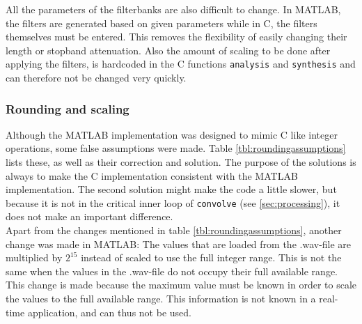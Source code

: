 \documentclass[a4paper]{article}
\begin{document}
All the parameters of the filterbanks are also difficult to change. In MATLAB, the filters are generated based on given parameters while in C, the filters themselves must be entered. This removes the flexibility of easily changing their length or stopband attenuation. Also the amount of scaling to be done after applying the filters, is hardcoded in the C functions \texttt{analysis} and \texttt{synthesis} and can therefore not be changed very quickly.

\subsubsection{Rounding and scaling}\label{sec:rounding}
Although the MATLAB implementation was designed to mimic C like integer operations, some false assumptions were made. Table \ref{tbl:roundingassumptions} lists these, as well as their correction and solution. The purpose of the solutions is always to make the C implementation consistent with the MATLAB implementation. The second solution might make the code a little slower, but because it is not in the critical inner loop of \texttt{convolve} (see \ref{sec:processing}), it does not make an important difference.\\

Apart from the changes mentioned in table \ref{tbl:roundingassumptions}, another change was made in MATLAB: The values that are loaded from the .wav-file are multiplied by $2^{15}$ instead of scaled to use the full integer range. This is not the same when the values in the .wav-file do not occupy their full available range. This change is made because the maximum value must be known in order to scale the values to the full available range. This information is not known in a real-time application, and can thus not be used.
\begin{table}[htb]
\centering
{}
\caption{False assumptions about rounding mechanisms, with their corrections and solutions}
\label{tbl:roundingassumptions}
\end{table}
\end{document}
